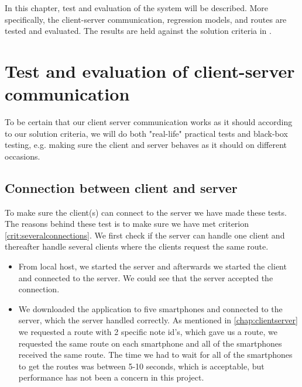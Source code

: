 In this chapter, test and evaluation of the system will be described. More specifically, the client-server communication, regression models, and routes are tested and evaluated. The results are held against the solution criteria in .

\section{Test and evaluation of client-server communication}
To be certain that our client server communication works as it should according to our solution criteria, we will do both "real-life" practical tests and black-box testing, e.g. making sure the client and server behaves as it should on different occasions.

\subsection{Connection between client and server}
To make sure the client(s) can connect to the server we have made these tests. The reasons behind these test is to make sure we have met criterion \ref{crit:severalconnections}. We first check if the server can handle one client and thereafter handle several clients where the clients request the same route. 
\begin{itemize}
	\item From local host, we started the server and afterwards we started the client and connected to the server. We could see that the server accepted the connection.
	\item We downloaded the application to five smartphones and connected to the server, which the server handled correctly. As mentioned in \autoref{chap:clientserver} we requested a route with 2 specific note id's, which gave us a route, we requested the same route on each smartphone and all of the smartphones received the same route. The time we had to wait for all of the smartphones to get the routes was between 5-10 seconds, which is acceptable, but performance has not been a concern in this project.
\end{itemize}


